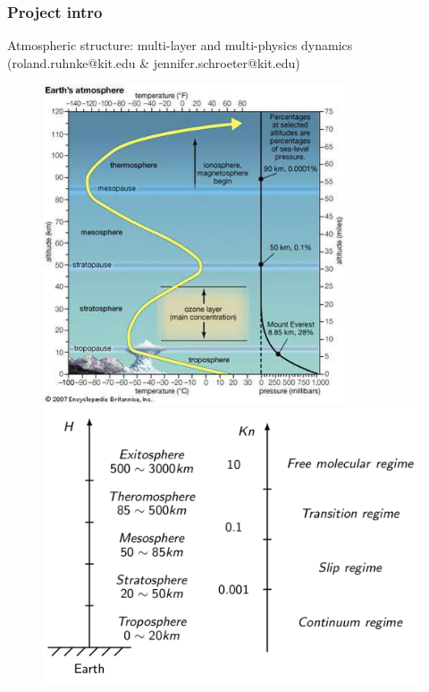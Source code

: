 \documentclass[18pt]{beamer}
\begin{document}
	\begin{frame}
	
		\frametitle{Project intro}

		Atmospheric structure: multi-layer and multi-physics dynamics (roland.ruhnke@kit.edu \& jennifer.schroeter@kit.edu)

		
		\begin{figure}
			\begin{minipage}{0.45\linewidth}
				\centering
				\includegraphics[width=0.8\textwidth]{../figs/atmospheric-layers.png}
			\end{minipage}
			\hfill
			\begin{minipage}{0.45\linewidth}
				\centering
				\includegraphics[width=1.0\textwidth]{atmosphere.png}
			\end{minipage}
		\end{figure}
		

\end{frame}
\end{document}
